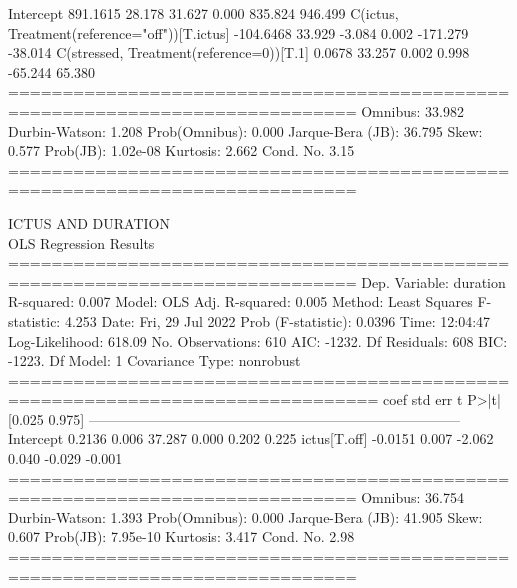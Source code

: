 Intercept                                       891.1615     28.178     31.627      0.000     835.824     946.499
C(ictus, Treatment(reference="off"))[T.ictus]  -104.6468     33.929     -3.084      0.002    -171.279     -38.014
C(stressed, Treatment(reference=0))[T.1]          0.0678     33.257      0.002      0.998     -65.244      65.380
==============================================================================
Omnibus:                       33.982   Durbin-Watson:                   1.208
Prob(Omnibus):                  0.000   Jarque-Bera (JB):               36.795
Skew:                           0.577   Prob(JB):                     1.02e-08
Kurtosis:                       2.662   Cond. No.                         3.15
==============================================================================

ICTUS AND DURATION \\
OLS Regression Results    \\
==============================================================================
Dep. Variable:               duration   R-squared:                       0.007
Model:                            OLS   Adj. R-squared:                  0.005
Method:                 Least Squares   F-statistic:                     4.253
Date:                Fri, 29 Jul 2022   Prob (F-statistic):             0.0396
Time:                        12:04:47   Log-Likelihood:                 618.09
No. Observations:                 610   AIC:                            -1232.
Df Residuals:                     608   BIC:                            -1223.
Df Model:                           1                                         
Covariance Type:            nonrobust                                         
================================================================================
                   coef    std err          t      P>|t|      [0.025      0.975]
--------------------------------------------------------------------------------
Intercept        0.2136      0.006     37.287      0.000       0.202       0.225
ictus[T.off]    -0.0151      0.007     -2.062      0.040      -0.029      -0.001
==============================================================================
Omnibus:                       36.754   Durbin-Watson:                   1.393
Prob(Omnibus):                  0.000   Jarque-Bera (JB):               41.905
Skew:                           0.607   Prob(JB):                     7.95e-10
Kurtosis:                       3.417   Cond. No.                         2.98
==============================================================================
\\

